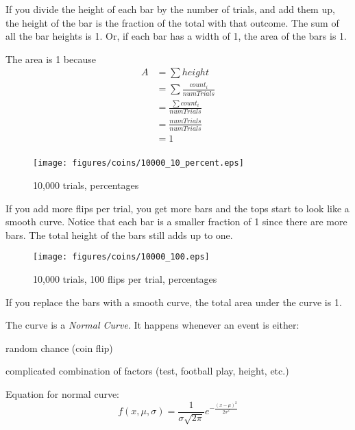 \documentclass{exam}
\begin{document}
  If you divide the height of each bar by the number of trials, and add them up, the
  height of the bar is the fraction of the total with that outcome.  The sum of all the
  bar heights is 1.  Or, if each bar has a width of 1, the area of the bars is 1.

  The area is 1 because
  \begin{align*}
    A & = \sum height \\
      & = \sum \frac{count_i}{numTrials} \\
      & = \frac{\sum count_i}{numTrials} \\
      & = \frac{numTrials}{numTrials} \\
      & = 1 \\
  \end{align*}

  \begin{figure}[H]
    \centering
    \texttt{[image: figures/coins/10000\_10\_percent.eps]}
    \caption{10,000 trials, percentages}
  \end{figure}

  If you add more flips per trial, you get more bars and the tops start to look like a
  smooth curve.  Notice that each bar is a smaller fraction of 1 since there are more
  bars.  The total height of the bars still adds up to one.

  \begin{figure}[H]
    \centering
    \texttt{[image: figures/coins/10000\_100.eps]}
    \caption{10,000 trials, 100 flips per trial, percentages}
  \end{figure}

  If you replace the bars with a smooth curve, the total area under the curve is 1.

  The curve is a {\em Normal Curve}.  It happens whenever an event is either:
  \begin{itemize*}
    \item random chance (coin flip)
    \item complicated combination of factors (test, football play, height, etc.)
  \end{itemize*}

  Equation for normal curve:
  \[
    f(x, \mu, \sigma) = \frac{1}{\sigma\sqrt{2\pi}} e^{ -\frac{(x-\mu)^2}{2\sigma^2} }
  \]
\end{document}
